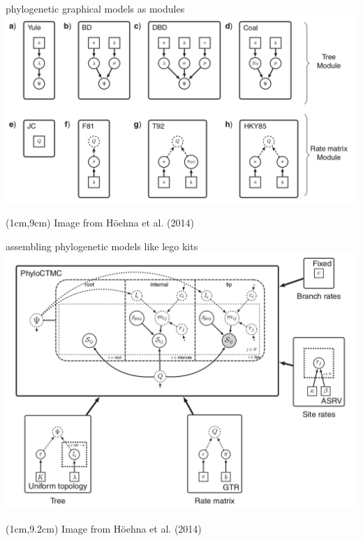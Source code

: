 \documentclass[mathserif]{beamer}
\begin{document}
\begin{frame}

    \small
    \begin{center}
    \alert{phylogenetic graphical models as modules}\\
    \bigskip
    \includegraphics[scale=0.3]{figures/graphical_modular.png}\\
    \end{center}
    \begin{textblock*}{10cm}(1cm,9cm)
    \tiny Image from H\"oehna et al. (2014)
    \end{textblock*}
\end{frame}


\begin{frame}
    \small
    \begin{center}
    \alert{assembling phylogenetic models like lego kits}\\
    \bigskip
    \includegraphics[scale=0.3]{figures/graphical_lego_kit.png}\\
    \end{center}
    \begin{textblock*}{10cm}(1cm,9.2cm)
    \tiny Image from H\"oehna et al. (2014)
    \end{textblock*}
\end{frame}
\end{document}
